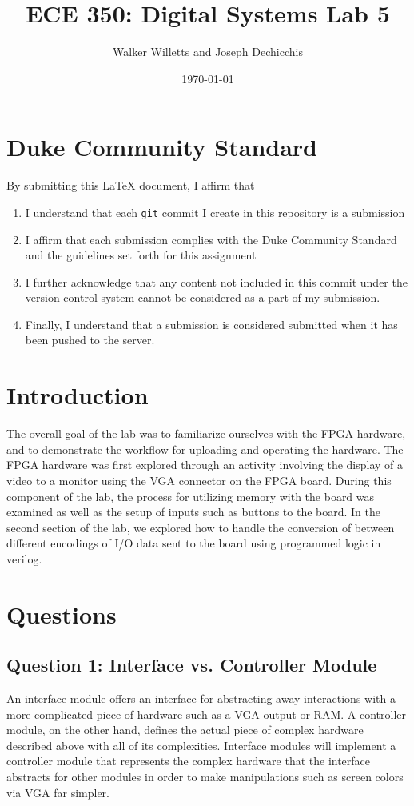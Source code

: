 \documentclass[letterpaper]{article} %
\begin{document}
\title{ECE 350: Digital Systems Lab 5}
\author{Walker Willetts and Joseph Dechicchis} %
\date{\today} %
\maketitle

\section*{Duke Community Standard}

By submitting this \LaTeX{} document, I affirm that
\begin{enumerate}
    \item I understand that each \texttt{git} commit I create in this repository is a submission
    \item I affirm that each submission complies with the Duke Community Standard and the guidelines set forth for this assignment
    \item I further acknowledge that any content not included in this commit under the version control system cannot be considered as a part of my submission.
    \item Finally, I understand that a submission is considered submitted when it has been pushed to the server.
\end{enumerate}
\newpage

\section{Introduction}
    The overall goal of the lab was to familiarize ourselves with the FPGA hardware, and to demonstrate the workflow for uploading and operating the hardware. The FPGA hardware was first explored through an activity involving the display of a video to a monitor using the VGA connector on the FPGA board. During this component of the lab, the process for utilizing memory with the board was examined as well as the setup of inputs such as buttons to the board. In the second section of the lab, we explored how to handle the conversion of between different encodings of I/O data sent to the board using programmed logic in verilog.

\section{Questions}
    \subsection{Question 1: Interface vs. Controller Module}
        An interface module offers an interface for abstracting away interactions with a more complicated piece of hardware such as a VGA output or RAM. A controller module, on the other hand, defines the actual piece of complex hardware described above with all of its complexities. Interface modules will implement a controller module that represents the complex hardware that the interface abstracts for other modules in order to make manipulations such as screen colors via VGA far simpler. 
\end{document}
